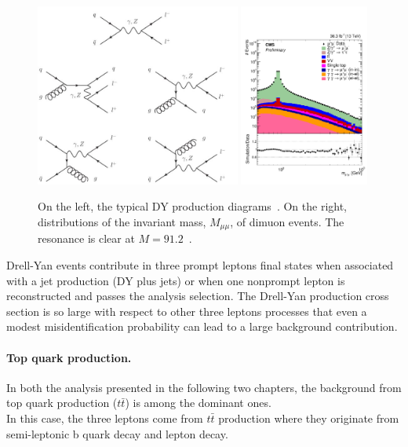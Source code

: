 \begin{figure}[h!]
\centering
  \includegraphics[height =
  6cm]{Figures/c4/dia/The-Feynman-graphs-for-Drell-Yan-pair-production-at-the-Oa-and-Oaa-s-orders_W640.jpeg}
\hspace{1cm}
  \includegraphics[height = 6cm]{Figures/c4/dia/Figure_001-a.pdf}
  \caption{On the left, the typical DY production
    diagrams~\cite{diagram}. On the right, distributions of the
    invariant mass, $M_{\mu \mu}$, of dimuon events. The \PZ resonance
    is clear at $M=91.2$\GeV~\cite{CMS-PAS-SMP-20-003}.}
  \label{fig:c44}
\end{figure}
Drell-Yan events contribute in three prompt leptons final states when
associated with a jet production (DY plus jets) or when one nonprompt
lepton is reconstructed and passes the analysis selection. The Drell-Yan
production cross section is so large with respect to other three
leptons processes that even a modest misidentification probability can
lead to a large background contribution.

\paragraph{Top quark production.}\label{sec:c4ttbar}
In both the analysis presented in the following two chapters, the
background from top quark production ($t\bar{t}$) is among the
dominant ones. \\
In this case, the three leptons come from $t\bar{t}$ production 
where they originate from semi-leptonic b quark decay and lepton \PW decay.

